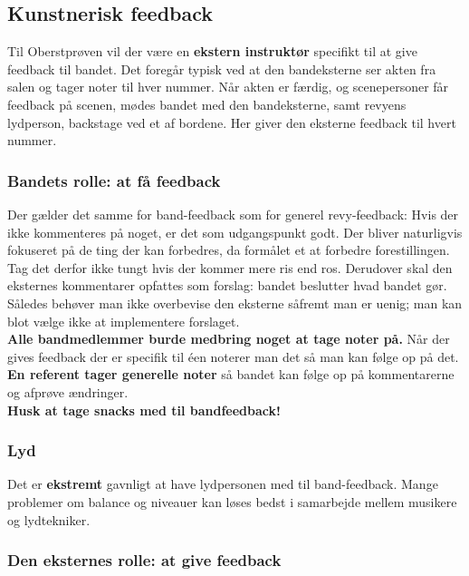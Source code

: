 \subsection{Kunstnerisk feedback}
Til Oberstprøven vil der være en \textbf{ekstern instruktør} specifikt til at give feedback til bandet. Det foregår typisk ved at den bandeksterne ser akten fra salen og tager noter til hver nummer. Når akten er færdig, og scenepersoner får feedback på scenen, mødes bandet med den bandeksterne, samt revyens lydperson, backstage ved et af bordene. Her giver den eksterne feedback til hvert nummer.

\subsubsection{Bandets rolle: at få feedback}
Der gælder det samme for band-feedback som for generel revy-feedback: Hvis der ikke kommenteres på noget, er det som udgangspunkt godt.
Der bliver naturligvis fokuseret på de ting der kan forbedres, da formålet et at forbedre forestillingen.
Tag det derfor ikke tungt hvis der kommer mere ris end ros.
Derudover skal den eksternes kommentarer opfattes som forslag: bandet beslutter hvad bandet gør.
Således behøver man ikke overbevise den eksterne såfremt man er uenig; man kan blot vælge ikke at implementere forslaget.\\
\textbf{Alle bandmedlemmer burde medbring noget at tage noter på.} Når der gives feedback der er specifik til éen noterer man det så man kan følge op på det.\\
\textbf{En referent tager generelle noter} så bandet kan følge op på kommentarerne og afprøve ændringer.\\
\textbf{Husk at tage snacks med til bandfeedback!}

\subsubsection{Lyd}
Det er \textbf{ekstremt} gavnligt at have lydpersonen med til band-feedback. Mange problemer om balance og niveauer kan løses bedst i samarbejde mellem musikere og lydtekniker.

\subsubsection{Den eksternes rolle: at give feedback}
